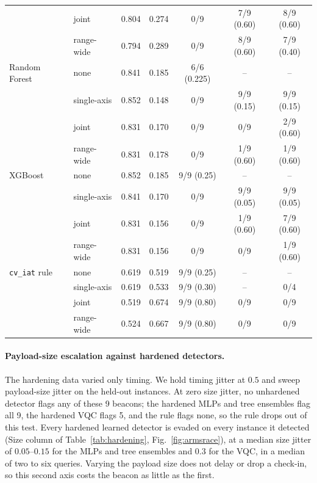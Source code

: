 \documentclass[preprint,12pt]{elsarticle}
\begin{document}
\begin{table}[htbp]
\begin{tabular}{llccccc}
                      & joint       & 0.804 & 0.274 & 0/9 & 7/9 (0.60) & 8/9 (0.60) \\
                      & range-wide  & 0.794 & 0.289 & 0/9 & 8/9 (0.60) & 7/9 (0.40) \\
\addlinespace
Random Forest         & none        & 0.841 & 0.185 & 6/6 (0.225) & -- & -- \\
                      & single-axis & 0.852 & 0.148 & 0/9 & 9/9 (0.15) & 9/9 (0.15) \\
                      & joint       & 0.831 & 0.170 & 0/9 & 0/9 & 2/9 (0.60) \\
                      & range-wide  & 0.831 & 0.178 & 0/9 & 1/9 (0.60) & 1/9 (0.60) \\
\addlinespace
XGBoost               & none        & 0.852 & 0.185 & 9/9 (0.25) & -- & -- \\
                      & single-axis & 0.841 & 0.170 & 0/9 & 9/9 (0.05) & 9/9 (0.05) \\
                      & joint       & 0.831 & 0.156 & 0/9 & 1/9 (0.60) & 7/9 (0.60) \\
                      & range-wide  & 0.831 & 0.156 & 0/9 & 0/9 & 1/9 (0.60) \\
\addlinespace
\texttt{cv\_iat} rule & none        & 0.619 & 0.519 & 9/9 (0.25) & -- & -- \\
                      & single-axis & 0.619 & 0.533 & 9/9 (0.30) & -- & 0/4 \\
                      & joint       & 0.519 & 0.674 & 9/9 (0.80) & 0/9 & 0/9 \\
                      & range-wide  & 0.524 & 0.667 & 9/9 (0.80) & 0/9 & 0/9 \\
\bottomrule
\end{tabular}
\end{table}

\paragraph{Payload-size escalation against hardened detectors.} The hardening data varied only timing.
We hold timing jitter at $0.5$ and sweep payload-size jitter on the held-out instances. At zero size
jitter, no unhardened detector flags any of these 9 beacons; the hardened MLPs and tree ensembles flag
all 9, the hardened VQC flags 5, and the rule flags none, so the rule drops out of this test. Every
hardened learned detector is evaded on
every instance it detected (Size column of Table~\ref{tab:hardening}, Fig.~\ref{fig:armsrace}), at a median size jitter
of $0.05$--$0.15$ for the MLPs and tree ensembles and $0.3$ for the VQC, in a median of two to six
queries. Varying the payload size does not delay or drop a check-in, so this second axis costs the
beacon as little as the first.
\end{document}
